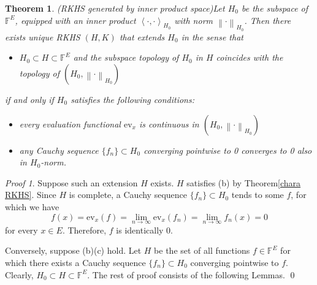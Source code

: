 \documentclass[a4paper,12pt]{article}
\newtheorem{thm}{Theorem}[section]
\theoremstyle{remark}
\newtheorem*{prf}{Proof}
\theoremstyle{definition}
\theoremstyle{definition}
\theoremstyle{definition}
\newcommand{\ip}[2]{\left<#1, #2 \right>}
\newcommand{\norm}[1]{\left\| #1 \right\|}
\newcommand{\ev}[1]{\mathrm{ev}_{#1}}
\begin{document}
\begin{thm} (RKHS generated by inner product space)\label{RKHS generated by ip sp}
	Let \( H_0 \) be the subspace of \( \mathbb{F}^E \), equipped with an inner product \( \ip{\cdot }{\cdot }_{H_0} \) with norm \( \norm{\cdot }_{H_0} \).
	Then there exists unique RKHS \( (H,K) \) that extends \( H_0 \) in the sense that
	\begin{itemize}
		\item[(a)] \( H_0 \subset H \subset \mathbb{F}^E\) and the subspace topology of \( H_0 \) in \( H \) coincides with the topology of \( (H_0, \norm{\cdot }_{H_0}) \)
	\end{itemize}
	if and only if \( H_0 \) satisfies the following conditions:
	\begin{itemize}
		\item[(b)] every evaluation functional \( \ev{x} \) is continuous in \( (H_0, \norm{\cdot }_{H_0})\)
		\item[(c)] any Cauchy sequence \( \{f_n\} \subset H_0 \) converging pointwise to 0 converges to 0 also in \( H_0 \)-norm.
	\end{itemize}
\end{thm}
\begin{prf}
	Suppose such an extension \( H \) exists. \( H \) satisfies (b) by Theorem\ref{chara RKHS}.
	Since \( H \) is complete, a Cauchy sequence \( \{f_n\} \subset H_0\) tends to some \( f \), for which we have
	\begin{equation*}
		f(x) = \ev{x}(f) = \lim_{n \to \infty} \ev{x}(f_n) = \lim_{n \to \infty} f_n(x) = 0
	\end{equation*}
	for every \( x \in E \). Therefore, \( f \) is identically 0.

	Conversely, suppose (b)(c) hold. Let \( H \) be the set of all functions \( f \in \mathbb{F}^E \) for which there exists a Cauchy sequence \( \{f_n\} \subset H_0 \) converging pointwise to \( f \). Clearly, \( H_0 \subset H \subset \mathbb{F}^E \). The rest of proof consists of the following Lemmas.
	\qed\end{prf}
\end{document}
